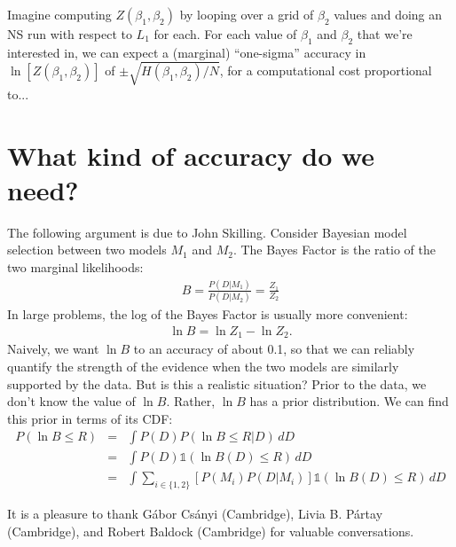 \documentclass[journal,article,accept,moreauthors,pdftex,12pt,a4paper]{mdpi}
\begin{document}
Imagine computing $Z(\beta_1, \beta_2)$ by looping over a grid of $\beta_2$
values and doing an NS run with respect to $L_1$ for each. For each
value of $\beta_1$ and $\beta_2$ that we're interested in, we can expect
a (marginal) ``one-sigma'' accuracy in
$\ln\left[Z(\beta_1, \beta_2)\right]$ of $\pm \sqrt{H(\beta_1, \beta_2)/N}$,
for a computational cost proportional to...

\section{What kind of accuracy do we need?}

The following argument is due to John Skilling. Consider Bayesian model selection
between two models $M_1$ and $M_2$. The Bayes Factor is the ratio of the
two marginal likelihoods:
\begin{eqnarray}
B = \frac{P(D | M_1)}{P(D | M_2)} = \frac{Z_1}{Z_2}
\end{eqnarray}
In large problems, the log of the Bayes Factor is usually more convenient:
\begin{eqnarray}
\ln B = \ln Z_1 - \ln Z_2.
\end{eqnarray}
Naively, we want $\ln B$ to an accuracy of about 0.1, so that we can reliably
quantify the strength of the evidence when the two models are similarly
supported by the data. But is this a realistic situation?
Prior to the data, we don't know the
value of $\ln B$. Rather, $\ln B$ has a prior distribution. We can find this
prior in terms of its CDF:
\begin{eqnarray}
P(\ln B \leq R) &=& \int P(D)P(\ln B \leq R | D) \, dD\\
&=& \int P(D) \mathds{1}\left(\ln B(D) \leq R\right) \, dD\\
&=& \int \sum_{i\in\{1,2\}}\left[P(M_i)P(D|M_i)\right] \mathds{1}\left(\ln B(D) \leq R\right) \, dD
\end{eqnarray}





It is a pleasure to thank Gábor Csányi (Cambridge), Livia B. Pártay (Cambridge),
and Robert Baldock (Cambridge) for valuable conversations.
\end{document}
